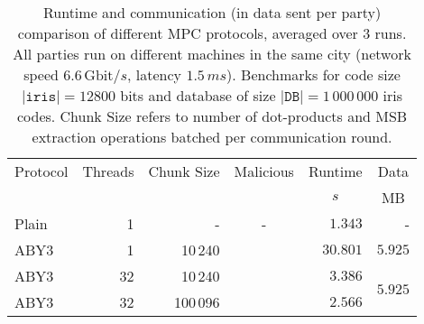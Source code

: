 \documentclass[a4paper,11pt,
]{article}
\newcommand{\xmark}{\ding{55}}%
\begin{document}
\begin{table}[ht]
    \centering
    \caption{Runtime and communication (in data sent per party) comparison of different MPC protocols, averaged over 3 runs. All parties run on different machines in the same city (network speed $6.6\,\text{Gbit}/s$, latency $1.5\,ms$). Benchmarks for code size $|\texttt{iris}| = 12800$ bits and database of size $|\texttt{DB}| = 1\,000\,000$ iris codes. Chunk Size refers to number of dot-products and MSB extraction operations batched per communication round.}
    \label{tab::bench_network_1m}
    \begin{tabular}{lrrcrr}
        \toprule
        \multicolumn{1}{c}{Protocol} & \multicolumn{1}{c}{Threads} & \multicolumn{1}{c}{Chunk Size} & \multicolumn{1}{c}{Malicious} & \multicolumn{1}{c}{Runtime} & \multicolumn{1}{c}{Data} \\
                                     &                             &                                &                               & \multicolumn{1}{c}{$s$}     & \multicolumn{1}{c}{MB}   \\
        \midrule
        Plain                        & 1                           & -                              & -                             & $1.343$                     & -                        \\
        ABY3                         & 1                           & 10\,240                        & \xmark                        & $30.801$                    & $5.925$                  \\
        \midrule
        ABY3                         & 32                          & 10\,240                        & \xmark                        & $3.386$                     & \multirow{2}{*}{$5.925$} \\
        ABY3                         & 32                          & 100\,096                       & \xmark                        & $2.566$                     &                          \\
        \bottomrule
    \end{tabular}
\end{table}
\end{document}
